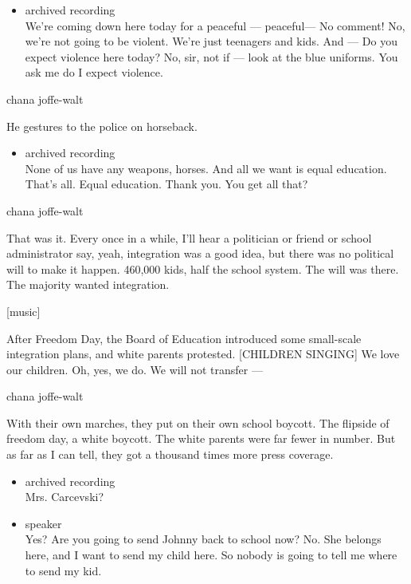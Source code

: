 \begin{itemize}
\tightlist
\item
  archived recording\\
  We're coming down here today for a peaceful --- peaceful--- No
  comment! No, we're not going to be violent. We're just teenagers and
  kids. And --- Do you expect violence here today? No, sir, not if ---
  look at the blue uniforms. You ask me do I expect violence.
\end{itemize}

chana joffe-walt

He gestures to the police on horseback.

\begin{itemize}
\tightlist
\item
  archived recording\\
  None of us have any weapons, horses. And all we want is equal
  education. That's all. Equal education. Thank you. You get all that?
\end{itemize}

chana joffe-walt

That was it. Every once in a while, I'll hear a politician or friend or
school administrator say, yeah, integration was a good idea, but there
was no political will to make it happen. 460,000 kids, half the school
system. The will was there. The majority wanted integration.

{[}music{]}

After Freedom Day, the Board of Education introduced some small-scale
integration plans, and white parents protested. {[}CHILDREN SINGING{]}
We love our children. Oh, yes, we do. We will not transfer ---

chana joffe-walt

With their own marches, they put on their own school boycott. The
flipside of freedom day, a white boycott. The white parents were far
fewer in number. But as far as I can tell, they got a thousand times
more press coverage.

\begin{itemize}
\item
  archived recording\\
  Mrs. Carcevski?
\item
  speaker\\
  Yes? Are you going to send Johnny back to school now? No. She belongs
  here, and I want to send my child here. So nobody is going to tell me
  where to send my kid.
\end{itemize}

